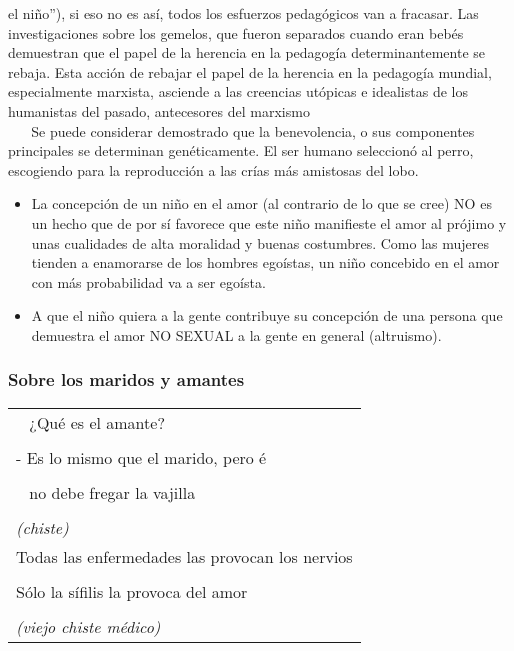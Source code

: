 el niño''), si eso no es así, todos los esfuerzos pedagógicos van a
fracasar. Las investigaciones sobre los gemelos, que fueron separados
cuando eran bebés demuestran que el papel de la herencia en la pedagogía
determinantemente se rebaja. Esta acción de rebajar el papel de la
herencia en la pedagogía mundial, especialmente marxista, asciende a las
creencias utópicas e idealistas de los humanistas del pasado,
antecesores del marxismo\\
\hspace*{0.333em} ~ ~ Se puede considerar demostrado que la
benevolencia, o sus componentes principales se determinan genéticamente.
El ser humano seleccionó al perro, escogiendo para la reproducción a las
crías más amistosas del lobo.

\begin{itemize}
\tightlist
\item
  La concepción de un niño en el amor (al contrario de lo que se cree)
  NO es un hecho que de por sí favorece que este niño manifieste el amor
  al prójimo y unas cualidades de alta moralidad y buenas costumbres.
  Como las mujeres tienden a enamorarse de los hombres egoístas, un niño
  concebido en el amor con más probabilidad va a ser egoísta.
\item
  A que el niño quiera a la gente contribuye su concepción de una
  persona que demuestra el amor NO SEXUAL a la gente en general
  (altruismo).
\end{itemize}

\protect\hypertarget{M14}{}{}

\hypertarget{sobre-los-maridos-y-amantes}{\subsubsection{Sobre los
maridos y amantes}\label{sobre-los-maridos-y-amantes}}

\begin{longtable}[]{@{}l@{}}
\toprule
~ ¿Qué es el amante?\tabularnewline
\tabularnewline
- Es lo mismo que el marido, pero é\tabularnewline
\tabularnewline
~ no debe fregar la vajilla\tabularnewline
\tabularnewline
\emph{(chiste)}\tabularnewline
Todas las enfermedades las provocan los nervios\tabularnewline
\tabularnewline
Sólo la sífilis la provoca del amor\tabularnewline
\tabularnewline
\emph{(viejo chiste médico)}\tabularnewline
\bottomrule
\end{longtable}


